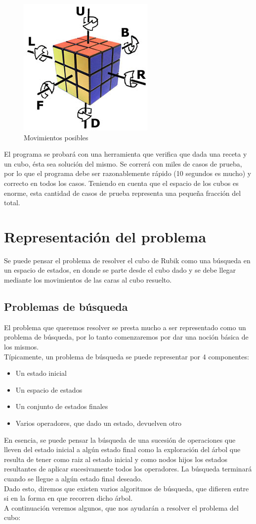 \documentclass[11pt,a4paper]{article}
\begin{document}
\begin{figure}[H]
  \centering
    \includegraphics{img/giros}
  \caption{Movimientos posibles}
  \label{fig:ejemplo}
\end{figure}

El programa se probará con una herramienta que verifica que dada una receta y un cubo, ésta sea solución del mismo. Se correrá con miles de casos de prueba, por lo que el programa debe ser razonablemente rápido (10 segundos es mucho) y correcto en todos los casos. Teniendo en cuenta que el espacio de los cubos es enorme, esta cantidad de casos de prueba representa una pequeña fracción del total.


\section{Representación del problema}

Se puede pensar el problema de resolver el cubo de Rubik como una búsqueda en un espacio de estados, en donde se parte desde el cubo dado y se debe llegar mediante los movimientos de las caras al cubo resuelto. 


\subsection{Problemas de búsqueda}
El problema que queremos resolver se presta mucho a ser representado como un problema de búsqueda, por lo tanto comenzaremos por dar una noción básica de los mismos. \\
Típicamente, un problema de búsqueda se puede representar por 4 componentes:
\begin{itemize}
\item Un estado inicial
\item Un espacio de estados
\item Un conjunto de estados finales 
\item Varios operadores, que dado un estado, devuelven otro
\end{itemize}
En esencia, se puede pensar la búsqueda de una sucesión de operaciones que lleven del estado inicial a algún estado final como la exploración del árbol que resulta de tener como raiz al estado inicial y como nodos hijos los estados resultantes de aplicar sucesivamente todos los operadores. La búsqueda terminará cuando se llegue a algún estado final deseado.\\
Dado esto, diremos que existen varios algoritmos de búsqueda, que difieren entre si en la forma en que recorren dicho árbol.\\
A continuación veremos algunos, que nos ayudarán a resolver el problema del cubo:
\end{document}
